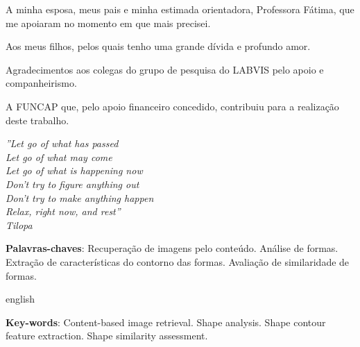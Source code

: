 \documentclass[
	12pt,				%
	openright,			%
	twoside,			%
	a4paper,			%
	english,			%
  	brazil				%
	]{abntex2}
\begin{document}
\begin{agradecimentos}
A minha esposa, meus pais e minha estimada orientadora, Professora Fátima, que me apoiaram no momento em que mais precisei. 

Aos meus filhos, pelos quais tenho uma grande dívida e profundo amor.

Agradecimentos aos colegas do grupo de pesquisa do LABVIS pelo apoio e companheirismo.

A FUNCAP que, pelo apoio financeiro concedido, contribuiu para a realização deste trabalho.

\end{agradecimentos}

\begin{epigrafe}
    \vspace*{\fill}
	\begin{flushright}
		\textit{''Let go of what has passed\\
        Let go of what may come\\
        Let go of what is happening now\\
        Don't try to figure anything out\\
        Don't try to make anything happen\\
        Relax, right now, and rest''\\
	Tilopa}
	\end{flushright}
\end{epigrafe}


\setlength{\absparsep}{18pt} %
\begin{resumo}

\vspace{\onelineskip}
\noindent 
 \textbf{Palavras-chaves}: Recuperação de imagens pelo conteúdo. Análise de formas. Extração de características do contorno das formas. Avaliação de similaridade de formas.
\end{resumo}

\begin{resumo}[Abstract]
\begin{otherlanguage*}{english}
 
\vspace{\onelineskip}
\noindent 
\textbf{Key-words}: Content-based image retrieval. Shape analysis. Shape contour feature extraction. Shape similarity assessment.
 \end{otherlanguage*}
\end{resumo}
\end{document}
